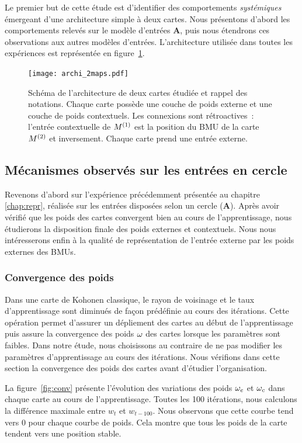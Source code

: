 \documentclass[../main]{subfiles}
\begin{document}
Le premier but de cette étude est d'identifier des comportements \emph{systémiques} émergeant d'une architecture simple à deux cartes.
Nous présentons d'abord les comportements relevés sur le modèle d'entrées \textbf{A}, puis nous étendrons ces observations aux autres modèles d'entrées. L'architecture utilisée dans toutes les expériences est représentée en figure~\ref{fig:archis}.

\begin{figure}[t]
	\centering\texttt{[image: archi\_2maps.pdf]}
	\caption{Schéma de l'architecture de deux cartes étudiée et rappel des notations. Chaque carte possède une couche de poids externe et une couche de poids contextuels. Les connexions sont rétroactives~: l'entrée contextuelle de $M^{({1})}$ est la position du BMU de la carte $M^{({2})}$ et inversement. Chaque carte prend une entrée externe.\label{fig:archis}}
\end{figure}


\subsection{Mécanismes observés sur les entrées en cercle}

Revenons d'abord sur l'expérience précédemment présentée au chapitre \ref{chap:repr}, réalisée sur les entrées disposées selon un cercle (\textbf{A}).
Après avoir vérifié que les poids des cartes convergent bien au cours de l'apprentissage, nous étudierons la disposition finale des poids externes et contextuels.
Nous nous intéresserons enfin à la qualité de représentation de l'entrée externe par les poids externes des BMUs.

\subsubsection{Convergence des poids}

Dans une carte de Kohonen classique, le rayon de voisinage et le taux d'apprentissage sont diminués de façon prédéfinie au cours des itérations. 
Cette opération permet d'assurer un dépliement des cartes au début de l'apprentissage puis assure la convergence des poids $\omega$ des cartes lorsque les paramètres sont faibles.
Dans notre étude, nous choisissons au contraire de ne pas modifier les paramètres d'apprentissage au cours des itérations.
Nous vérifions dans cette section la convergence des poids des cartes avant d'étudier l'organisation. 

La figure~\ref{fig:conv} présente l'évolution des variations des poids $\omega_{e}$ et $\omega_{c}$ dans chaque carte au cours de l'apprentissage. Toutes les 100 itérations, nous calculons la différence maximale entre $w_t$ et $w_{t-100}$.
Nous observons que cette courbe tend vers $0$ pour chaque courbe de poids. Cela montre que tous les poids de la carte tendent vers une position stable.
\end{document}
